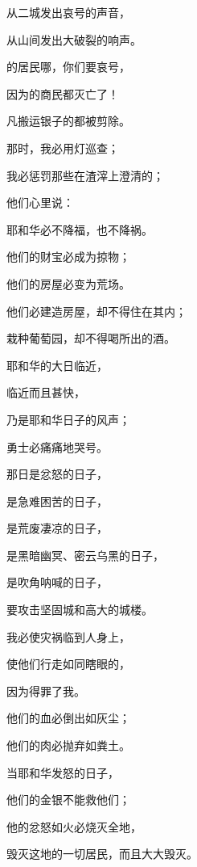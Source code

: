 {\par }{\Q 从二城发出哀号的声音，
\par }{\Q 从山间发出大破裂的响声。
\par }{\Q {}的居民哪，你们要哀号，
\par }{\Q 因为{}的商民都灭亡了！
\par }{\Q 凡搬运银子的都被剪除。
\par }{\Q {}那时，我必用灯巡查{}；
\par }{\Q 我必惩罚那些{}在渣滓上澄清的；
\par }{\Q 他们心里说：
\par }{\Q 耶和华必不降福，也不降祸。
\par }{\Q {}他们的财宝必成为掠物；
\par }{\Q 他们的房屋必变为荒场。
\par }{\Q 他们必建造房屋，却不得住在其内；
\par }{\Q 栽种葡萄园，却不得喝所出的酒。
\par }{\BB \par }{\Q {}耶和华的大日临近，
\par }{\Q 临近而且甚快，
\par }{\Q 乃是耶和华日子的风声；
\par }{\Q 勇士必痛痛地哭号。
\par }{\Q {}那日是忿怒的日子，
\par }{\Q 是急难困苦的日子，
\par }{\Q 是荒废凄凉的日子，
\par }{\Q 是黑暗幽冥、密云乌黑的日子，
\par }{\Q {}是吹角呐喊的日子，
\par }{\Q 要攻击坚固城和高大的城楼。
\par }{\BB \par }{\Q {}我必使灾祸临到人身上，
\par }{\Q 使他们行走如同瞎眼的，
\par }{\Q 因为得罪了我。
\par }{\Q 他们的血必倒出如灰尘；
\par }{\Q 他们的肉必抛弃如粪土。
\par }{\Q {}当耶和华发怒的日子，
\par }{\Q 他们的金银不能救他们；
\par }{\Q 他的忿怒如火必烧灭全地，
\par }{\Q 毁灭这地的一切居民，而且大大毁灭。

}
